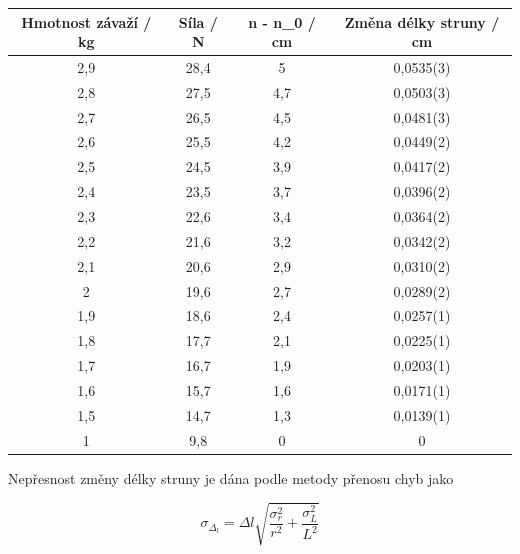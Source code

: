 \begin{table}[h]
\centering
\begin{tabular}{|c|c|c|c|}
\hline
Hmotnost závaží / kg & Síla / N & n - n\_0 / cm & Změna délky struny / cm \\ \hline
2,9                  & 28,4     & 5             & 0,0535(3)                  \\ \hline
2,8                  & 27,5     & 4,7           & 0,0503(3)                  \\ \hline
2,7                  & 26,5     & 4,5           & 0,0481(3)                  \\ \hline
2,6                  & 25,5     & 4,2           & 0,0449(2)                  \\ \hline
2,5                  & 24,5     & 3,9           & 0,0417(2)                  \\ \hline
2,4                  & 23,5     & 3,7           & 0,0396(2)                  \\ \hline
2,3                  & 22,6     & 3,4           & 0,0364(2)                  \\ \hline
2,2                  & 21,6     & 3,2           & 0,0342(2)                  \\ \hline
2,1                  & 20,6     & 2,9           & 0,0310(2)                  \\ \hline
2                    & 19,6     & 2,7           & 0,0289(2)                  \\ \hline
1,9                  & 18,6     & 2,4           & 0,0257(1)                  \\ \hline
1,8                  & 17,7     & 2,1           & 0,0225(1)                  \\ \hline
1,7                  & 16,7     & 1,9           & 0,0203(1)                  \\ \hline
1,6                  & 15,7     & 1,6           & 0,0171(1)                  \\ \hline
1,5                  & 14,7     & 1,3           & 0,0139(1)                  \\ \hline
1                    & 9,8      & 0             & 0                  \\ \hline
\end{tabular}
\end{table}

Nepřesnost změny délky struny je dána podle metody přenosu chyb jako

\begin{equation}
    \sigma_\Delta_l = \Delta l \sqrt{\frac{\sigma^2_r}{r^2}+\frac{\sigma^2_L}{L^2}}
\end{equation}

